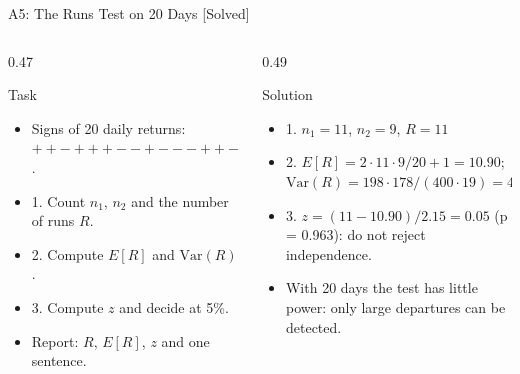 \begin{frame}{A5: The Runs Test on 20 Days [Solved]}
\itemsize{\scriptsize}
\begin{columns}[T]
\begin{column}{0.47\textwidth}
\begin{block}{Task}
\begin{itemize}
    \item Signs of 20 daily returns: $+ + - + + + - - + - - - + + - + - - + +$.
    \item 1. Count $n_1$, $n_2$ and the number of runs $R$.
    \item 2. Compute $E[R]$ and $\mathrm{Var}(R)$.
    \item 3. Compute $z$ and decide at 5\%.
    \item Report: $R$, $E[R]$, $z$ and one sentence.
\end{itemize}
\end{block}
\end{column}
\begin{column}{0.49\textwidth}
\begin{exampleblock}{Solution}
\begin{itemize}
    \item 1. $n_1 = 11$, $n_2 = 9$, $R = 11$
    \item 2. $E[R] = 2 \cdot 11 \cdot 9/20 + 1 = 10.90$; $\mathrm{Var}(R) = 198 \cdot 178/(400 \cdot 19) = 4.64$
    \item 3. $z = (11 - 10.90)/2.15 = 0.05$ (p = 0.963): do not reject independence.
    \item With 20 days the test has little power: only large departures can be detected.
\end{itemize}
\end{exampleblock}
\end{column}
\end{columns}
\end{frame}


